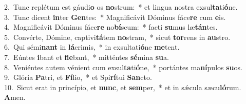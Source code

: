 {2.~}Tunc replétum est gáudi\textbf{o} os \textbf{no}strum:~* et lingua nostra exsul\textbf{ta}ti\textbf{ó}ne.\\
{3.~}Tunc dicent \textbf{in}ter \textbf{Gen}tes:~* Magnificávit Dóminus fáce\textbf{re} cum \textbf{e}is.\\
{4.~}Magnificávit Dóminus fáce\textbf{re} no\textbf{bí}scum:~* facti \textbf{su}mus læ\textbf{tán}tes.\\
{5.~}Convérte, Dómine, captivi\textbf{tá}tem \textbf{no}stram,~* sicut \textbf{tor}rens in \textbf{au}stro.\\
{6.~}Qui sémi\textbf{nant} in \textbf{lá}crimis,~* in exsultati\textbf{ó}ne \textbf{me}tent.\\
{7.~}Eúntes \textbf{i}bant et \textbf{fle}bant,~* mitténtes \textbf{sé}mina \textbf{su}a.\\
{8.~}Veniéntes autem vénient cum exsul\textbf{ta}ti\textbf{ó}ne,~* portántes ma\textbf{ní}pulos \textbf{su}os.\\
{9.~}Glória \textbf{Pa}tri, et \textbf{Fí}lio,~* et Spi\textbf{rí}tui \textbf{San}cto.\\
{10.~}Sicut erat in princípio, et \textbf{nunc}, et \textbf{sem}per,~* et in sǽcula sæcu\textbf{ló}rum. \textbf{A}men.\\

